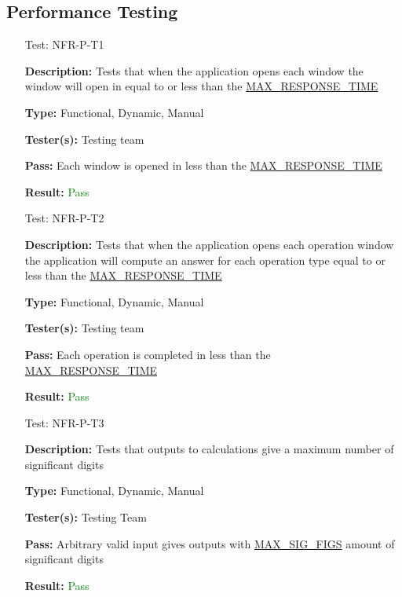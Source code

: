 \documentclass[12pt, titlepage]{article}
\begin{document}
\subsection{Performance Testing}
\begin{enumerate}
    
\item[Test:]{NFR-P-T1\\}

\textbf{Description:} Tests that when the application opens each window the window will open in equal to or less than the \hyperref[sec:sp]{MAX\_RESPONSE\_TIME}

\textbf{Type:} Functional, Dynamic, Manual

\textbf{Tester(s):} Testing team

\textbf{Pass:} Each window is opened in less than the \hyperref[sec:sp]{MAX\_RESPONSE\_TIME}
					
\textbf{Result:} \textcolor{Green}{Pass}

\item[Test:]{NFR-P-T2\\}

\textbf{Description:} Tests that when the application opens each operation window the application will compute an answer for each operation type equal to or less than the \hyperref[sec:sp]{MAX\_RESPONSE\_TIME}

\textbf{Type:} Functional, Dynamic, Manual

\textbf{Tester(s):} Testing team

\textbf{Pass:} Each operation is completed in less than the \hyperref[sec:sp]{MAX\_RESPONSE\_TIME}
					
\textbf{Result:} \textcolor{Green}{Pass}

\item[Test:]{NFR-P-T3\\}

\textbf{Description:} Tests that outputs to calculations give a maximum number of significant digits

\textbf{Type:} Functional, Dynamic, Manual

\textbf{Tester(s):} Testing Team

\textbf{Pass:} Arbitrary valid input gives outputs with \hyperref[sec:sp]{MAX\_SIG\_FIGS} amount of significant digits
					
\textbf{Result:} \textcolor{Green}{Pass}

\end{enumerate}
\end{document}
